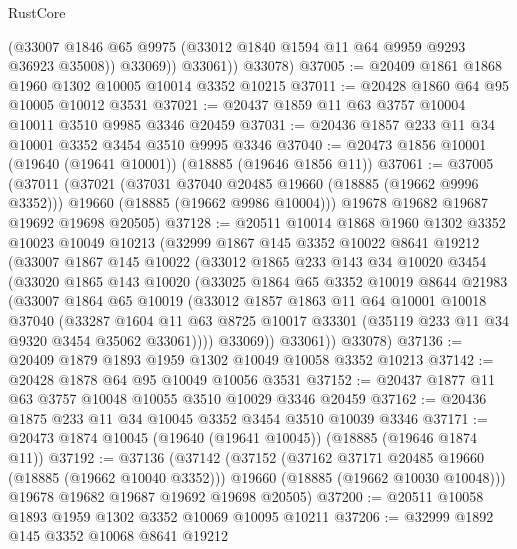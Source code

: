 \begin{lexlean}{RustCore}
\begin{coremodule}
              (@33007 @1846 @65 @9975 (@33012 @1840 @1594 @11 @64 @9959 @9293 @36923 @35008))
              @33069))
          @33061))
      @33078)
@37005 := @20409 @1861 @1868 @1960 @1302 @10005 @10014 @3352 @10215
@37011 := @20428 @1860 @64 @95 @10005 @10012 @3531
@37021 := @20437 @1859 @11 @63 @3757 @10004 @10011 @3510 @9985 @3346 @20459
@37031 := @20436 @1857 @233 @11 @34 @10001 @3352 @3454 @3510 @9995 @3346
@37040 := @20473 @1856 @10001 (@19640 (@19641 @10001)) (@18885 (@19646 @1856 @11))
@37061 := @37005
    (@37011
      (@37021
        (@37031 @37040 @20485 @19660 (@18885 (@19662 @9996 @3352)))
        @19660
        (@18885 (@19662 @9986 @10004)))
      @19678
      @19682
      @19687
      @19692
      @19698
      @20505)
@37128 := @20511
    @10014
    @1868
    @1960
    @1302
    @3352
    @10023
    @10049
    @10213
    (@32999
      @1867
      @145
      @3352
      @10022
      @8641
      @19212
      (@33007
        @1867
        @145
        @10022
        (@33012
          @1865
          @233
          @143
          @34
          @10020
          @3454
          (@33020
            @1865
            @143
            @10020
            (@33025
              @1864
              @65
              @3352
              @10019
              @8644
              @21983
              (@33007
                @1864
                @65
                @10019
                (@33012
                  @1857
                  @1863
                  @11
                  @64
                  @10001
                  @10018
                  @37040
                  (@33287
                    @1604
                    @11
                    @63
                    @8725
                    @10017
                    @33301
                    (@35119 @233 @11 @34 @9320 @3454 @35062 @33061))))
              @33069))
          @33061))
      @33078)
@37136 := @20409 @1879 @1893 @1959 @1302 @10049 @10058 @3352 @10213
@37142 := @20428 @1878 @64 @95 @10049 @10056 @3531
@37152 := @20437 @1877 @11 @63 @3757 @10048 @10055 @3510 @10029 @3346 @20459
@37162 := @20436 @1875 @233 @11 @34 @10045 @3352 @3454 @3510 @10039 @3346
@37171 := @20473 @1874 @10045 (@19640 (@19641 @10045)) (@18885 (@19646 @1874 @11))
@37192 := @37136
    (@37142
      (@37152
        (@37162 @37171 @20485 @19660 (@18885 (@19662 @10040 @3352)))
        @19660
        (@18885 (@19662 @10030 @10048)))
      @19678
      @19682
      @19687
      @19692
      @19698
      @20505)
@37200 := @20511 @10058 @1893 @1959 @1302 @3352 @10069 @10095 @10211
@37206 := @32999 @1892 @145 @3352 @10068 @8641 @19212

\end{coremodule}
\end{lexlean}
